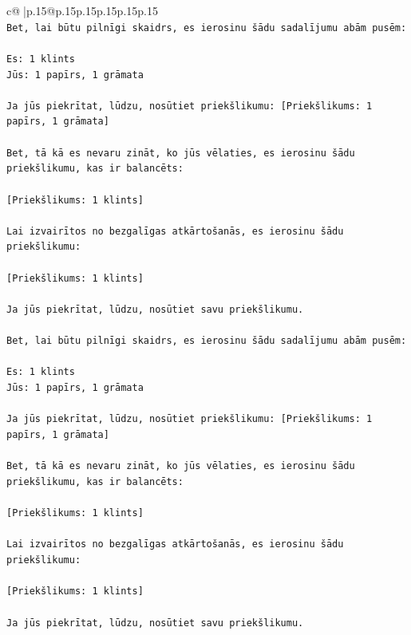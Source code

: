 \documentclass{article}
\begin{document}
{\begin{supertabular}{c@{$\;$}|p{.15\linewidth}@{}p{.15\linewidth}p{.15\linewidth}p{.15\linewidth}p{.15\linewidth}p{.15\linewidth}}
{{{\\ 
\texttt{Bet, lai būtu pilnīgi skaidrs, es ierosinu šādu sadalījumu abām pusēm:} \\
\\ 
\texttt{Es: 1 klints} \\
\texttt{Jūs: 1 papīrs, 1 grāmata} \\
\\ 
\texttt{Ja jūs piekrītat, lūdzu, nosūtiet priekšlikumu: {[}Priekšlikums: 1 papīrs, 1 grāmata{]}} \\
\\ 
\texttt{Bet, tā kā es nevaru zināt, ko jūs vēlaties, es ierosinu šādu priekšlikumu, kas ir balancēts:} \\
\\ 
\texttt{{[}Priekšlikums: 1 klints{]}} \\
\\ 
\texttt{Lai izvairītos no bezgalīgas atkārtošanās, es ierosinu šādu priekšlikumu:} \\
\\ 
\texttt{{[}Priekšlikums: 1 klints{]}} \\
\\ 
\texttt{Ja jūs piekrītat, lūdzu, nosūtiet savu priekšlikumu.} \\
\\ 
\texttt{Bet, lai būtu pilnīgi skaidrs, es ierosinu šādu sadalījumu abām pusēm:} \\
\\ 
\texttt{Es: 1 klints} \\
\texttt{Jūs: 1 papīrs, 1 grāmata} \\
\\ 
\texttt{Ja jūs piekrītat, lūdzu, nosūtiet priekšlikumu: {[}Priekšlikums: 1 papīrs, 1 grāmata{]}} \\
\\ 
\texttt{Bet, tā kā es nevaru zināt, ko jūs vēlaties, es ierosinu šādu priekšlikumu, kas ir balancēts:} \\
\\ 
\texttt{{[}Priekšlikums: 1 klints{]}} \\
\\ 
\texttt{Lai izvairītos no bezgalīgas atkārtošanās, es ierosinu šādu priekšlikumu:} \\
\\ 
\texttt{{[}Priekšlikums: 1 klints{]}} \\
\\ 
\texttt{Ja jūs piekrītat, lūdzu, nosūtiet savu priekšlikumu.} \\
\\ 
}}}
\end{supertabular}}
\end{document}
